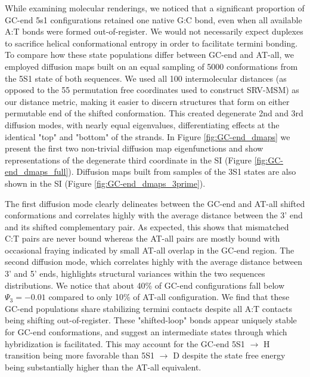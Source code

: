 \documentclass[journal=jpcbfk,manuscript=article]{achemso}
\begin{document}
While examining molecular renderings, we noticed that a significant proportion of GC-end 5s1 configurations retained one native G:C bond, even when all available A:T bonds were formed out-of-register. We would not necessarily expect duplexes to sacrifice helical conformational entropy in order to facilitate termini bonding. To compare how these state populations differ between GC-end and AT-all, we employed diffusion maps built on an equal sampling of 5000 conformations from the 5S1 state of both sequences. We used all 100 intermolecular distances (as opposed to the 55 permutation free coordinates used to construct SRV-MSM) as our distance metric, making it easier to discern structures that form on either permutable end of the shifted conformation. This created degenerate 2nd and 3rd diffusion modes, with nearly equal eigenvalues, differentiating effects at the identical "top" and "bottom" of the strands. In Figure \ref{fig:GC-end_dmaps} we present the first two non-trivial diffusion map eigenfunctions and show representations of the degenerate third coordinate in the SI (Figure \ref{fig:GC-end_dmaps_full}). Diffusion maps built from samples of the 3S1 states are also shown in the SI (Figure \ref{fig:GC-end_dmaps_3prime}). 

The first diffusion mode clearly delineates between the GC-end and AT-all shifted conformations and correlates highly with the average distance between the 3' end and its shifted complementary pair. As expected, this shows that mismatched C:T pairs are never bound whereas the AT-all pairs are mostly bound with occasional fraying indicated by small AT-all overlap in the GC-end region. The second diffusion mode, which correlates highly with the average distance between 3' and 5' ends, highlights structural variances within the two sequences distributions. We notice that about 40\% of GC-end configurations fall below $\Psi_3 = -0.01$  compared to only 10\% of AT-all configuration. We find that these GC-end populations share stabilizing termini contacts despite all A:T contacts being shifting out-of-register. These "shifted-loop" bonds appear uniquely stable for GC-end conformations,  and suggest an intermediate states through which hybridization is facilitated. This may account for the GC-end 5S1 $\rightarrow$ H transition being more favorable than  5S1 $\rightarrow$ D despite the state free energy being substantially higher than the AT-all equivalent.

\end{document}
